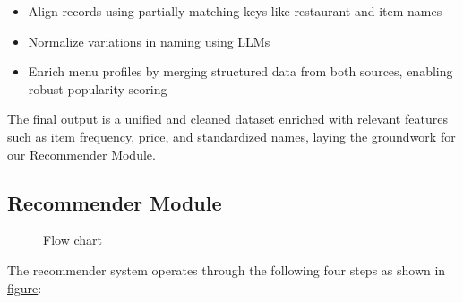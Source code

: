 \documentclass[
  11pt,
  a4paper,
  DIV=11,
  numbers=noendperiod]{scrartcl}
\providecommand{\tightlist}{%
  \setlength{\itemsep}{0pt}\setlength{\parskip}{0pt}}\usepackage{longtable,booktabs,array}
\begin{document}
\begin{itemize}
\tightlist
\item
  Align records using partially matching keys like restaurant and item
  names\\
\item
  Normalize variations in naming using LLMs\\
\item
  Enrich menu profiles by merging structured data from both sources,
  enabling robust popularity scoring
\end{itemize}

The final output is a unified and cleaned dataset enriched with relevant
features such as item frequency, price, and standardized names, laying
the groundwork for our Recommender Module.

\subsection{Recommender Module}\label{recommender-module}

\begin{figure}

\caption{\label{fig-visual-flow}Flow chart}


\end{figure}%

The recommender system operates through the following four steps as
shown in \hyperref[fig-visual-flow]{figure}:
\end{document}
